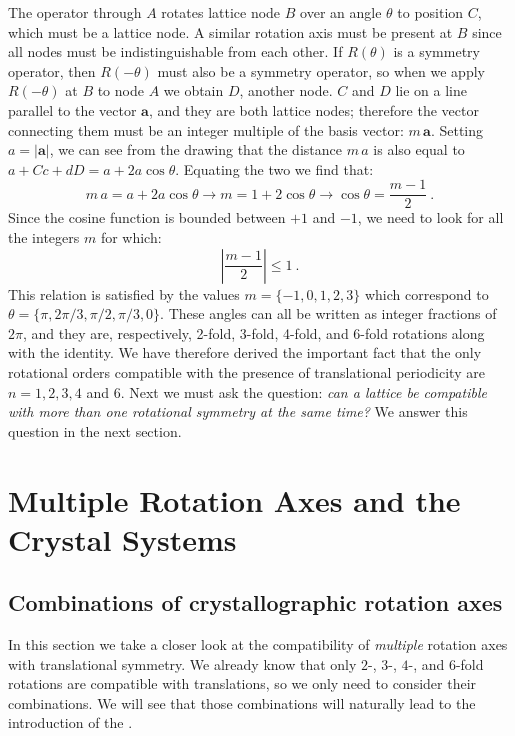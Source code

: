 The operator through $A$ rotates lattice node $B$ over an angle $\theta$ to position $C$, which must be a lattice node. A similar rotation axis must be present at $B$ since all nodes must be indistinguishable from each other.  If $R(\theta)$ is a symmetry operator, then $R(-\theta)$ must also be a symmetry operator, so when we apply $R(-\theta)$ at $B$ to node $A$ we obtain $D$, another node.  $C$ and $D$ lie on a line parallel to the vector $\mathbf{a}$, and they are both lattice nodes; therefore the vector connecting them must be an integer multiple of the basis vector: $m\,\mathbf{a}$. Setting $a=\vert\mathbf{a}\vert$, we can see from the drawing that the distance $m\,a$ is also equal to $a+Cc+dD=a + 2a\cos\theta$.  Equating the two we find that:
\[
	m\, a = a + 2a\cos\theta\rightarrow m=1+2\cos\theta\rightarrow\cos\theta=\frac{m-1}{2}\ .
\]
Since the cosine function is bounded between $+1$ and $-1$, we need to look for all the integers $m$ for which:
\[
	\left\vert \frac{m-1}{2} \right\vert \le 1\ .
\]
This relation is satisfied by the values $m=\{-1,0,1,2,3\}$ which correspond to $\theta=\{\pi,2\pi/3,\pi/2,\pi/3,0\}$. These angles can all be written as integer fractions of $2\pi$, and they are, respectively, 2-fold, 3-fold, 4-fold, and 6-fold rotations along with the identity.  We have therefore derived the important fact that the only rotational orders compatible with the presence of translational periodicity are $n=1,2,3,4$ and $6$.  Next we must ask the question: \textit{can a lattice be compatible with more than one rotational symmetry at the same time?}  We answer this question in the next section.

\section{Multiple Rotation Axes and the Crystal Systems}\label{\chabbr:sec:allowedrots}

\subsection{Combinations of crystallographic rotation axes}\label{\chabbr:ssec:rotcombos}

In this section we take a closer look at the compatibility of \textit{multiple} rotation axes with translational symmetry.  We already know that only $2$-, $3$-, $4$-, and $6$-fold rotations are compatible with translations, so we only need to consider their combinations. We will see that those combinations will naturally lead to the introduction of the . 

